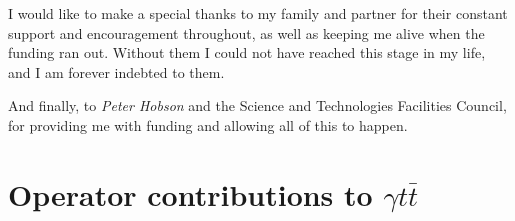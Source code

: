 \documentclass[oneside, a4paper, 11pt, ]{report}
\begin{document}
I would like to make a special thanks to my family and partner for their constant support and encouragement throughout, as well as keeping me alive when the funding ran out. Without them I could not have reached this stage in my life, and I am forever indebted to them.

And finally, to \emph{Peter Hobson} and the Science and Technologies Facilities Council, for providing me with funding and allowing all of this to happen. 

\clearpage %


\setcounter{page}{1}

\pagestyle{fancy}
\fancyhead[L,RO]{\slshape \nouppercase } %
\fancyhead[RE,LO]{\slshape \nouppercase \leftmark}

\tableofcontents
\listoffigures
\listoftables
\clearpage


\setcounter{page}{1}

\clearpage


















% 

% 



\appendix
\appendixpage
\addappheadtotoc

\renewcommand{\thesection}{A.\arabic{section}}
\renewcommand\thefigure{\thesection}
\renewcommand\thetable{\thesection}

\section{Operator contributions to $\gamma t \bar{t}$}
\end{document}
